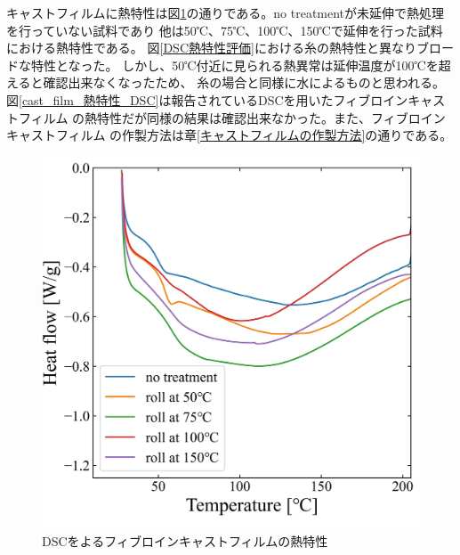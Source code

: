 \documentclass[dvipdfmx,12pt,a4paper]{jreport}
\begin{document}
		\newpage
		キャストフィルムに熱特性は図\ref{cast_film_DSC}の通りである。no treatmentが未延伸で熱処理を行っていない試料であり
		他は50℃、75℃、100℃、150℃で延伸を行った試料における熱特性である。
		図\ref{DSC熱特性評価}における糸の熱特性と異なりブロードな特性となった。
		しかし、50℃付近に見られる熱異常は延伸温度が100℃を超えると確認出来なくなったため、
		糸の場合と同様に水によるものと思われる。
		図\ref{cast_film_熱特性_DSC}は報告されているDSCを用いたフィブロインキャストフィルム
		の熱特性だが同様の結果は確認出来なかった。また、フィブロインキャストフィルム
		の作製方法は章\ref{キャストフィルムの作製方法}の通りである。
		\begin{figure}[h]
			\centering
			\includegraphics[scale=0.9]{cast_film_DSC_20210621.jpg}
			\caption{DSCをよるフィブロインキャストフィルムの熱特性}
			\label{cast_film_DSC}
		\end{figure}
\end{document}

